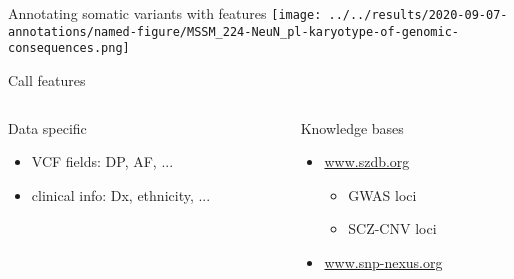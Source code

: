 \documentclass[usenames,dvipsnames]{beamer}
\begin{document}
\begin{frame}{Annotating somatic variants with features}
\texttt{[image: ../../results/2020-09-07-annotations/named-figure/MSSM\_224-NeuN\_pl-karyotype-of-genomic-consequences.png]}
\end{frame}

\begin{frame}{Call features}
\begin{columns}[t]
\begin{column}{0.5\textwidth}
	Data specific
\begin{itemize}
\item VCF fields: DP, AF, ...
\item clinical info: Dx, ethnicity, ...
\end{itemize}
\end{column}
\begin{column}{0.5\textwidth}
	Knowledge bases
\begin{itemize}
\item \url{www.szdb.org}
\begin{itemize}
\item GWAS loci
\item SCZ-CNV loci
\end{itemize}
\item \url{www.snp-nexus.org}
\end{itemize}
\end{column}
\end{columns}
\end{frame}
\end{document}
